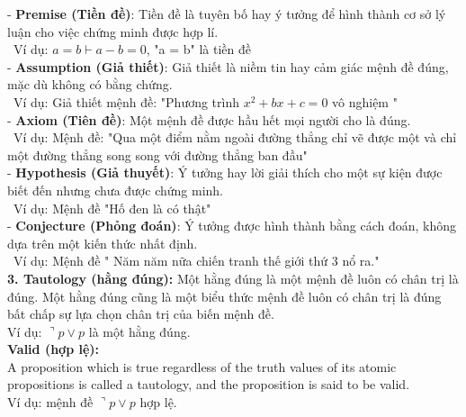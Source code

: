\documentclass[a4paper]{article}
\begin{document}
{\large\hspace{1cm}- \textbf{Premise (Tiền đề)}: Tiền đề là tuyên bố hay ý tưởng để hình thành cơ sở lý luận cho việc chứng minh được hợp lí.\\
	
\ Ví dụ: $a = b \vdash a - b = 0$, "a = b" là tiền đề}\\

{\large\hspace{1cm}- \textbf{Assumption (Giả thiết)}: Giả thiết là niềm tin hay cảm giác mệnh đề đúng, mặc dù không có bằng chứng.\\
	
\ Ví dụ: Giả thiết mệnh đề: "Phương trình $x^2 + bx + c = 0$ vô nghiệm "}\\

{\large\hspace{1cm}- \textbf{Axiom (Tiên đề)}: Một mệnh đề được hầu hết mọi người cho là đúng.\\
	
\ Ví dụ: Mệnh đề: "Qua một điểm nằm ngoài đường thẳng chỉ vẽ được một và chỉ một đường thẳng song song với đường thẳng ban đầu"}\\

{\large\hspace{1cm}- \textbf{Hypothesis (Giả thuyết)}: Ý tưởng hay lời giải thích cho một sự kiện được biết đến nhưng chưa được chứng minh. \\
	
\ Ví dụ: Mệnh đề "Hố đen là có thật"}\\

{\large\hspace{1cm}- \textbf{Conjecture (Phỏng đoán)}: Ý tưởng được hình thành bằng cách đoán, không dựa trên một kiến thức nhất định.\\
	
\ Ví dụ: Mệnh đề " Năm năm nữa chiến tranh thế giới thứ 3 nổ ra."}\\

\textbf{{\large\hspace{0.5cm} 3. Tautology (hằng đúng): }}{\large Một hằng đúng là một mệnh đề luôn có chân trị là đúng. Một hằng đúng cũng là một biểu thức mệnh đề luôn có chân trị là đúng bất chấp sự lựa chọn chân trị của biến mệnh đề.\\
	
	\hspace{1.5 cm} Ví dụ: $\urcorner p \vee p$ là một hằng đúng.
}\\

\textbf{{\large\hspace{1 cm} Valid (hợp lệ): }}\\
{\large A proposition which is true regardless of the truth values of its atomic propositions is called a tautology, and the proposition is said to be valid.\\
	
	\hspace{1.5 cm} Ví dụ: mệnh đề $\urcorner p \vee p$ hợp lệ.}\\
\end{document}
